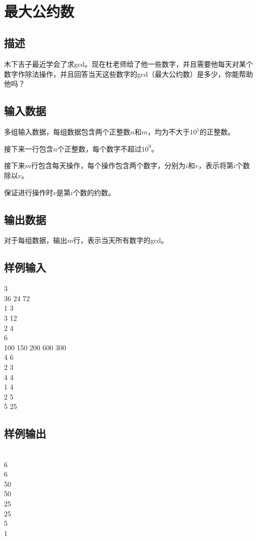 \documentclass[UTF8]{ctexrep}
\begin{document}
\tt
{}
\fi


\section{最大公约数}
\subsection*{描述}
木下吉子最近学会了求gcd。现在杜老师给了他一些数字，并且需要他每天对某个数字作除法操作，并且回答当天这些数字的gcd（最大公约数）是多少，你能帮助他吗？

\subsection*{输入数据}
多组输入数据，每组数据包含两个正整数$n$和$m$，均为不大于$10^5$的正整数。

接下来一行包含$n$个正整数，每个数字不超过$10^9$。

接下来$m$行包含每天操作，每个操作包含两个数字，分别为$i$和$v$，表示将第$i$个数除以$v$。

保证进行操作时$v$是第$i$个数的约数。

\subsection*{输出数据}
对于每组数据，输出$m$行，表示当天所有数字的gcd。

\subsection*{样例输入}
 3\\
36 24 72\\
1 3\\
3 12\\
2 4\\

 6\\
100 150 200 600 300\\
4 6\\
2 3\\
4 4\\
1 4\\
2 5\\
5 25

\subsection*{样例输出}
\\
6\\
6\\
50\\
50\\
25\\
25\\
5\\
1


\ifx\allfiles\undefined
\end{document}
